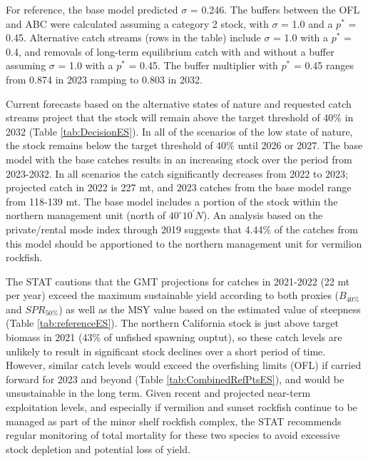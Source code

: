 \documentclass[11pt,
  english,
]{article}
\begin{document}
For reference, the base model predicted {\(\sigma\)\leavevmode\tagmcend\tagstructend} = 0.246. The buffers between the OFL and ABC were calculated assuming a category 2 stock, with {\(\sigma\)\leavevmode\tagmcend\tagstructend} = 1.0 and a {\(p^*\)\leavevmode\tagmcend\tagstructend} = 0.45. Alternative catch streams (rows in the table) include {\(\sigma\)\leavevmode\tagmcend\tagstructend} = 1.0 with a {\(p^*\)\leavevmode\tagmcend\tagstructend} = 0.4, and removals of long-term equilibrium catch with and without a buffer assuming {\(\sigma\)\leavevmode\tagmcend\tagstructend} = 1.0 with a {\(p^*\)\leavevmode\tagmcend\tagstructend} = 0.45. The buffer multiplier with {\(p^*\)\leavevmode\tagmcend\tagstructend} = 0.45 ranges from 0.874 in 2023 ramping to 0.803 in 2032.

Current forecasts based on the alternative states of nature and requested catch streams project that the stock will remain above the target threshold of 40\% in 2032 (Table \ref{tab:DecisionES}). In all of the scenarios of the low state of nature, the stock remains below the target threshold of 40\% until 2026 or 2027. The base model with the base catches results in an increasing stock over the period from 2023-2032. In all scenarios the catch significantly decreases from 2022 to 2023; projected catch in 2022 is 227 mt, and 2023 catches from the base model range from 118-139 mt. The base model includes a portion of the stock within the northern management unit (north of $40^\circ 10^\prime N$). An analysis based on the private/rental mode index through 2019 suggests that 4.44\% of the catches from this model should be apportioned to the northern management unit for vermilion rockfish.

The STAT cautions that the GMT projections for catches in 2021-2022 (22 mt per year) exceed the maximum sustainable yield according to both proxies ({\(B_{40\%}\)\leavevmode\tagmcend\tagstructend} and {\(SPR_{50\%}\)\leavevmode\tagmcend\tagstructend}) as well as the MSY value based on the estimated value of steepness (Table \ref{tab:referenceES}). The northern California stock is just above target biomass in 2021 (43\% of unfished spawning ouptut), so these catch levels are unlikely to result in significant stock declines over a short period of time. However, similar catch levels would exceed the overfishing limits (OFL) if carried forward for 2023 and beyond (Table \ref{tab:CombinedRefPtsES}), and would be unsustainable in the long term. Given recent and projected near-term exploitation levels, and especially if vermilion and sunset rockfish continue to be managed as part of the minor shelf rockfish complex, the STAT recommends regular monitoring of total mortality for these two species to avoid excessive stock depletion and potential loss of yield.
\end{document}
